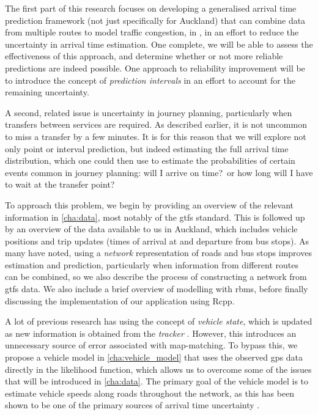 The first part of this research focuses on developing a generalised arrival time prediction framework (not just specifically for Auckland) that can combine data from multiple routes to model traffic congestion, in \rt{}, in an effort to reduce the uncertainty in arrival time estimation. One complete, we will be able to assess the effectiveness of this approach, and determine whether or not more reliable predictions are indeed possible. One approach to reliability improvement will be to introduce the concept of \emph{prediction intervals} in an effort to account for the remaining uncertainty.


A second, related issue is uncertainty in journey planning, particularly when transfers between services are required. As described earlier, it is not uncommon to miss a transfer by a few minutes. It is for this reason that we will explore not only point or interval prediction, but indeed estimating the full arrival time distribution, which one could then use to estimate the probabilities of certain events common in journey planning: will I arrive on time?\ or how long will I have to wait at the transfer point?



To approach this problem, we begin by providing an overview of the relevant information in \cref{cha:data}, most notably of the \gls{gtfs} standard. This is followed up by an overview of the data available to us in Auckland, which includes vehicle positions and trip updates (times of arrival at and departure from bus stops). As many have noted, using a \emph{network} representation of roads and bus stops improves estimation and prediction, particularly when information from different routes can be combined, so we also describe the process of constructing a network from \gls{gtfs} data. We also include a brief overview of \rt{} modelling with \glspl{rbm}, before finally discussing the \rt{} implementation of our application using \textsf{Rcpp}.


A lot of previous research has using the concept of \emph{vehicle state}, which is updated as new information is obtained from the \emph{tracker} \citep{Cathey_2003}. However, this introduces an unnecessary source of error associated with map-matching. To bypass this, we propose a \rt{} vehicle model in \cref{cha:vehicle_model} that uses the observed \gls{gps} data directly in the likelihood function, which allows us to overcome some of the issues that will be introduced in \cref{cha:data}. The primary goal of the vehicle model is to estimate vehicle speeds along roads throughout the network, as this has been shown to be one of the primary sources of arrival time uncertainty \citep{Shalaby_2004,Yu_2010,Yu_2011,Yin_2017}.


